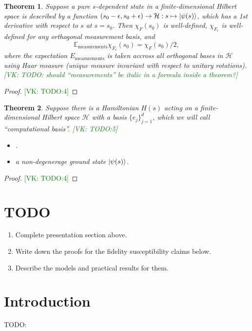 \documentclass[american,aps,pra,reprint,floatfix,nofootinbib,superscriptaddress]{revtex4-2}
\newtheorem{theorem}{Theorem}
\newcommand{\VK}[1]{\textcolor{green}{[VK: #1]}}
\begin{document}
\begin{theorem}
Suppose a pure $s$-dependent state in a finite-dimensional Hilbert space
is described by a function
$(s_0 - \epsilon, s_0 + \epsilon) \to \mathcal{H}: s \mapsto \ket{\psi(s)}$,
which has a 1st derivative with respect to $s$ at $s=s_0$.
Then $\chi_F(s_0)$ is well-defined, $\chi_{F_c}$ is well-defined for any
orthogonal measurement basis, and
\begin{equation}
\mathbb{E}_{\textrm{measurements}} \chi_{F_c}(s_0) = \chi_F(s_0)/2,
\end{equation}
where the expectation $E_{\textrm{measurements}}$ is taken accross
all orthogonal bases in $\mathcal{H}$ using Haar measure (unique measure
invariant with respect to unitary rotations).
\VK{TODO: should ``measurements'' be italic in a formula inside a theorem?}
\end{theorem}
\begin{proof}
\VK{TODO:4}
\end{proof}

\begin{theorem}
Suppose there is a Hamiltonian $H(s)$ acting on a finite-dimensional Hilbert
space $\mathcal{H}$ with a basis $\{e_j\}_{j=1}^{d}$, which we will call
``computational basis''. \VK{TODO:5}
\begin{itemize}
  \item .
  \item a non-degenerage ground state $\ket{\psi(s)}$.
\end{itemize}
\end{theorem}
\begin{proof}
\VK{TODO:4}
\end{proof}

\section{TODO}
\begin{enumerate}
\item Complete presentation section above.
\item Write down the proofs for the fidelity susceptibility claims below.
\item Describe the models and practical results for them.
\end{enumerate}

\section{Introduction}
TODO:
\end{document}
